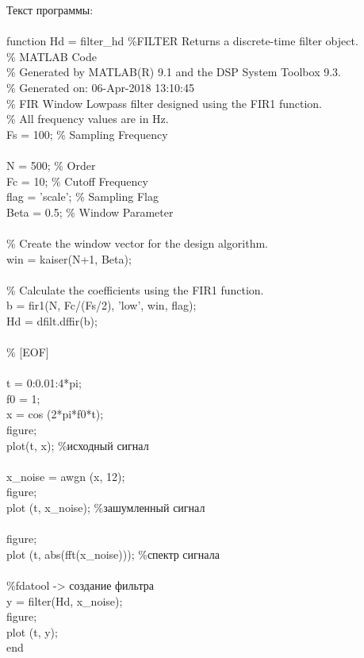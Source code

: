 \documentclass[12pt,a4paper]{report}
\begin{document}
Текст программы:\\\\
function Hd = filter\_hd
\%FILTER Returns a discrete-time filter object.\\
\% MATLAB Code\\
\% Generated by MATLAB(R) 9.1 and the DSP System Toolbox 9.3.\\
\% Generated on: 06-Apr-2018 13:10:45\\
\% FIR Window Lowpass filter designed using the FIR1 function.\\
\% All frequency values are in Hz.\\
Fs = 100; \% Sampling Frequency\\\\
N    = 500;      \% Order\\
Fc   = 10;       \% Cutoff Frequency\\
flag = 'scale';  \% Sampling Flag\\
Beta = 0.5;      \% Window Parameter\\\\
\% Create the window vector for the design algorithm.\\
win = kaiser(N+1, Beta);\\\\
\% Calculate the coefficients using the FIR1 function.\\
b  = fir1(N, Fc/(Fs/2), 'low', win, flag);\\
Hd = dfilt.dffir(b);\\\\
\% [EOF]\\\\
t = 0:0.01:4*pi;\\
f0 = 1;\\
x = cos (2*pi*f0*t);\\
figure;\\
plot(t, x); \%исходный сигнал\\\\
x\_noise = awgn (x, 12);\\
figure;\\
plot (t, x\_noise); \%зашумленный сигнал\\\\
figure;\\
plot (t, abs(fft(x\_noise))); \%спектр сигнала\\\\
\%fdatool -> создание фильтра\\
y = filter(Hd, x\_noise);\\
figure;\\
plot (t, y);\\
end\\
\end{document}
